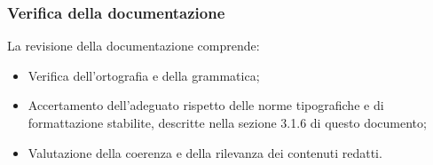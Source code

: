 \subsubsection{Verifica della documentazione}
La revisione della documentazione comprende:
\begin{itemize}
    \item Verifica dell'ortografia e della grammatica;
    \item Accertamento dell'adeguato rispetto delle norme tipografiche e di formattazione stabilite,
    descritte nella sezione 3.1.6 di questo documento;
    \item Valutazione della coerenza e della rilevanza dei contenuti redatti.
\end{itemize}
